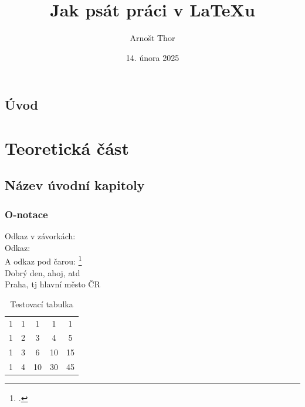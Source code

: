 \documentclass[12pt]{report}
\author{Arnošt Thor}                  %
\title{Jak psát práci v \LaTeX{}u}    %
\date{14. února 2025}                 %
\begin{document}
	\mytitlepage						%
	
	
	\abstrakt{
		\lipsum[1]						%
	}{
		\lipsum[1]						%
	}
	
	\podekovani{
		\lipsum[2]						%
	}
	
   {\tableofcontents\newpage}			%
	
\addtocounter{page}{1}		%
\chapter*{Úvod}     %
	
\lipsum[1]	
	
\part{Teoretická část}  %
	
\chapter{Název úvodní kapitoly}
			
\section{O-notace}
	Odkaz v závorkách: \parencite[see][page 900]{einstein}\\
	Odkaz: \cite{knuthwebsite}\\
	A odkaz pod čarou: \footcite[see][s. 42]{latexcompanion}\\
	Dobrý den, ahoj, \gls{atd}\\
	Praha, \gls{tj} hlavní město ČR
	
	\begin{table}
 		\caption{Testovací tabulka}
		\label{tab:test2}
			\begin{tabular}{ccccc}
				1 & 1 & 1  & 1  & 1  \\
				1 & 2 & 3  & 4  & 5  \\
				1 & 3 & 6  & 10 & 15 \\
				1 & 4 & 10 & 30 & 45
				\end{tabular}
	\end{table}
\end{document}
